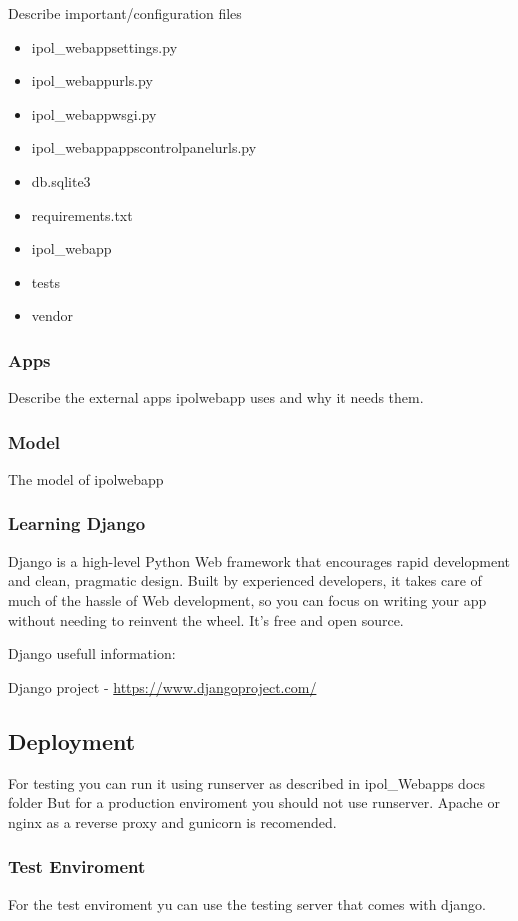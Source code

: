 Describe important/configuration files

\begin{itemize}
\item  ipol\_webapp\/settings.py
\item  ipol\_webapp\/urls.py
\item  ipol\_webapp\/wsgi.py

\item  ipol\_webapp\/apps\/controlpanel\/urls.py
\item  db.sqlite3
\item  requirements.txt
\item  ipol\_webapp
\item  tests
\item  vendor
\end{itemize}



\subsubsection{Apps}
Describe the external apps ipolwebapp uses and why it needs them.

\subsubsection{Model}
The model of ipolwebapp

\subsubsection{Learning Django}
Django is a high-level Python Web framework that encourages rapid development and clean, pragmatic design. Built by experienced developers, it takes care of much of the hassle of Web development, so you can focus on writing your app without needing to reinvent the wheel. It’s free and open source.

Django usefull information:

Django project - \url{https://www.djangoproject.com/}

\subsection{Deployment}
For testing you can run it using runserver as described in ipol\_Webapps docs folder
But for a production enviroment you should not use runserver. Apache or nginx as a reverse proxy and gunicorn is recomended.

\subsubsection{Test Enviroment}
For the test enviroment yu can use the testing server that comes with django.

